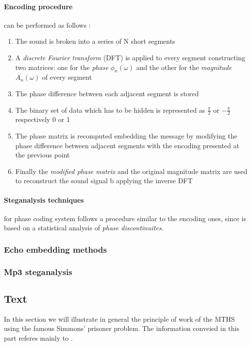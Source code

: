 \documentclass[../../main.tex]{subfiles}
\begin{document}
    \paragraph{Encoding procedure} can be performed as follows
    \cite{techniques-data-hiding}:
    \begin{enumerate}
        \item The sound is broken into a series of N short segments
        \item A \emph{discrete Fourier transform} (DFT) is applied to every
            segment constructing two matrices: one for the \emph{phase}
            $\phi_n(\omega)$ and the other for the \emph{magnitude}
            $A_n(\omega)$ of every segment
        \item The phase difference between each adjacent segment is stored
        \item The binary set of data which has to be hidden is represented as
            $\frac{\pi}{2}$ or $-\frac{\pi}{2}$ respectively 0 or 1
        \item The phase matrix is recomputed embedding the message by modifying
            the phase difference between adjacent segments with the encoding
            presented at the previous point
        \item Finally the \emph{modified phase matrix} and the original
            magnitude matrix are used to reconstruct the sound signal b
            applying the inverse DFT
    \end{enumerate}

    \paragraph{Steganalysis techniques} for phase coding system follows a
    procedure similar to the encoding ones, since is based on a statistical
    analysis of \emph{phase discontinuites}.
    

    \cite{steganalysis-phase-coding}


    \subsubsection{Echo embedding methods}

    \subsubsection{Mp3 steganalysis}

    

    \subsection{Text}
    In this section we will illustrate in general the principle of work of the MTHS using the famous Simmons' prisoner problem.
    The information conveied in this part referes mainly to \cite{modern-text-hiding}.
\end{document}
